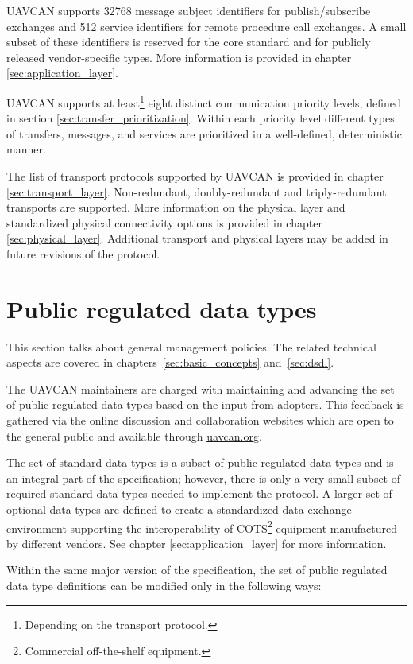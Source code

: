 UAVCAN supports 32768 message subject identifiers for publish/subscribe exchanges and
512 service identifiers for remote procedure call exchanges.
A small subset of these identifiers is reserved for the core standard and for publicly released vendor-specific types.
More information is provided in chapter \ref{sec:application_layer}.

UAVCAN supports at least\footnote{Depending on the transport protocol.} eight distinct communication priority levels,
defined in section \ref{sec:transfer_prioritization}.
Within each priority level different types of transfers, messages, and services are
prioritized in a well-defined, deterministic manner.

The list of transport protocols supported by UAVCAN is provided in chapter \ref{sec:transport_layer}.
Non-redundant, doubly-redundant and triply-redundant transports are supported.
More information on the physical layer and standardized physical connectivity options
is provided in chapter \ref{sec:physical_layer}.
Additional transport and physical layers may be added in future revisions of the protocol.

\section{Public regulated data types}

This section talks about general management policies.
The related technical aspects are covered in chapters~\ref{sec:basic_concepts} and~\ref{sec:dsdl}.

The UAVCAN maintainers are charged with maintaining and advancing the set of
public regulated data types based on the input from adopters.
This feedback is gathered via the online discussion and collaboration websites
which are open to the general public and available through \href{http://uavcan.org}{uavcan.org}.

The set of standard data types is a subset of public regulated data types and is an integral part of the specification;
however, there is only a very small subset of required standard data types needed to implement the protocol.
A larger set of optional data types are defined to create a standardized data exchange environment
supporting the interoperability of COTS\footnote{Commercial off-the-shelf equipment.}
equipment manufactured by different vendors.
See chapter \ref{sec:application_layer} for more information.

Within the same major version of the specification,
the set of public regulated data type definitions can be modified only in the following ways:

